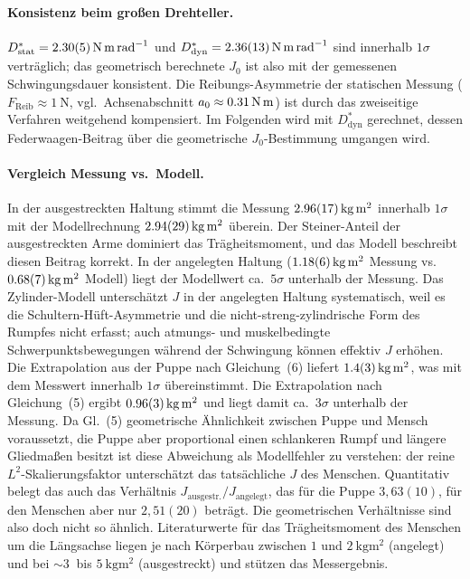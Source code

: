\documentclass[11pt,a4paper]{article}
\begin{document}
\paragraph{Konsistenz beim großen Drehteller.}
$D^{*}_{\mathrm{stat}}=\SI{2{,}30(5)}{\newton\metre\per\radian}$
und $D^{*}_{\mathrm{dyn}}=\SI{2{,}36(13)}{\newton\metre\per\radian}$
sind innerhalb $1\sigma$ verträglich; das geometrisch berechnete
$J_{0}$ ist also mit der gemessenen Schwingungsdauer konsistent.
Die Reibungs-Asymmetrie der statischen Messung
($F_{\mathrm{Reib}} \approx \SI{1}{\newton}$, vgl.\ Achsenabschnitt
$a_{0}\approx\SI{0{,}31}{\newton\metre}$) ist durch das
zweiseitige Verfahren weitgehend kompensiert. Im Folgenden wird
mit $D^{*}_{\mathrm{dyn}}$ gerechnet, dessen Federwaagen-Beitrag
über die geometrische $J_{0}$-Bestimmung umgangen wird.

\paragraph{Vergleich Messung vs.\ Modell.}
In der ausgestreckten Haltung stimmt die Messung
$\SI{2{,}96(17)}{\kilogram\metre\squared}$ innerhalb $1\sigma$ mit der
Modellrechnung $\SI{2{,}94(29)}{\kilogram\metre\squared}$
überein. Der Steiner-Anteil der ausgestreckten Arme dominiert
das Trägheitsmoment, und das Modell beschreibt diesen Beitrag
korrekt. In der angelegten Haltung
($\SI{1{,}18(6)}{\kilogram\metre\squared}$ Messung vs.\
$\SI{0{,}68(7)}{\kilogram\metre\squared}$ Modell) liegt der
Modellwert ca.\ $5\sigma$ unterhalb der Messung. Das Zylinder-Modell
unterschätzt $J$ in der angelegten Haltung systematisch, weil es
die Schultern-Hüft-Asymmetrie und die nicht-streng-zylindrische
Form des Rumpfes nicht erfasst; auch atmungs- und muskelbedingte
Schwerpunktsbewegungen während der Schwingung können effektiv $J$
erhöhen. Die Extrapolation aus der Puppe nach Gleichung~(6) liefert
$\SI{1{,}4(3)}{\kilogram\metre\squared}$, was mit dem Messwert
innerhalb $1\sigma$ übereinstimmt. Die Extrapolation nach
Gleichung~(5) ergibt $\SI{0{,}96(3)}{\kilogram\metre\squared}$ und
liegt damit ca.\ $3\sigma$ unterhalb der Messung. Da Gl.~(5)
geometrische Ähnlichkeit zwischen Puppe und Mensch voraussetzt, die
Puppe aber proportional einen schlankeren Rumpf und längere
Gliedmaßen besitzt ist diese Abweichung als Modellfehler zu
verstehen: der reine $L^{2}$-Skalierungsfaktor unterschätzt das
tatsächliche $J$ des Menschen. Quantitativ belegt das auch das
Verhältnis $J_{\text{ausgestr.}}/J_{\text{angelegt}}$, das für die
Puppe $3{,}63(10)$, für den Menschen aber nur $2{,}51(20)$ beträgt.
Die geometrischen Verhältnisse sind also doch nicht so ähnlich. Literaturwerte für das Trägheitsmoment des Menschen
um die Längsachse liegen je nach Körperbau zwischen $1$ und
$\SI{2}{\kilogram\metre\squared}$ (angelegt) und bei $\sim\SI{3}{}$
bis $\SI{5}{\kilogram\metre\squared}$ (ausgestreckt)
\cite{demtroeder} und stützen das Messergebnis.
\end{document}
